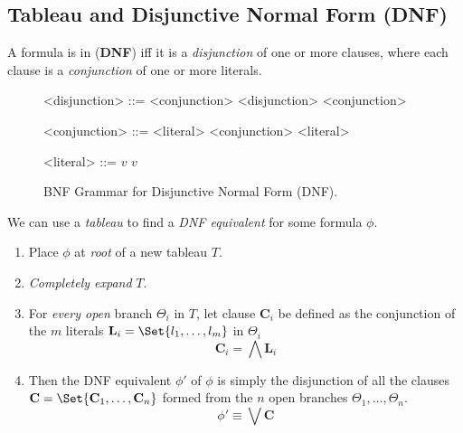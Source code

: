 \subsection{Tableau and Disjunctive Normal Form (DNF)}

\begin{definition}
    A formula is in  (\textbf{DNF}) iff
    it is a \textit{disjunction} of one or more clauses, where each
    clause is a \textit{conjunction} of one or more literals.
    
    \begin{figure}[H]
        \centering
        \begin{grammar}
        <disjunction> ::= \lit{$($} <conjunction> \lit{$\lor$} 
                <disjunction> \lit{$)$}
            \alt <conjunction>
        
        <conjunction> ::= \lit{$($} <literal> \lit{$\lor$} 
                <conjunction> \lit{$)$}
            \alt <literal>
        
        <literal> ::= \lit{$\neg$} $v$ 
                \quad{}
            \alt $v$
                \quad{}
        \end{grammar}
        \caption{BNF Grammar for Disjunctive Normal Form (DNF).}
        \label{fig:dnf_bnf}
    \end{figure}
\end{definition}

\begin{definition}
    We can use a \textit{tableau} to find a \textit{DNF equivalent} for
    some formula $\phi$.
    
    \begin{enumerate}
        \item Place $\phi$ at \textit{root} of a new tableau $T$.
        \item \textit{Completely expand} $T$.
        \item For \textit{every open} branch $\Theta_i$ in $T$, let
            clause $\mathbf{C}_i$ be defined as the conjunction of the 
            $m$ literals $\mathbf{L}_i = \Set{ l_1, \ldots, l_m }$ in 
            $\Theta_i$
            \begin{equation}
                \mathbf{C}_i = \bigwedge \mathbf{L}_i
            \end{equation}
        \item Then the DNF equivalent $\phi'$ of $\phi$ is simply the 
        disjunction of all the clauses 
        $\mathbf{C} = \Set{ \mathbf{C}_1, \ldots, \mathbf{C}_n }$
        formed from the $n$ open branches $\Theta_1, \ldots, \Theta_n$.
            \begin{equation}
                \phi' \equiv \bigvee \mathbf{C}
            \end{equation}
    \end{enumerate}
\end{definition}
